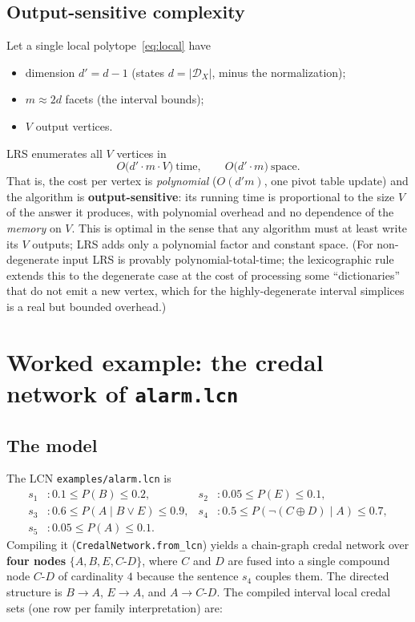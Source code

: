 \documentclass[11pt]{article}
\begin{document}
\subsection{Output-sensitive complexity}

Let a single local polytope~\eqref{eq:local} have
\begin{itemize}
  \item dimension $d' = d-1$ (states $d = |\mathcal{D}_X|$, minus the normalization);
  \item $m \approx 2d$ facets (the interval bounds);
  \item $V$ output vertices.
\end{itemize}
LRS enumerates all $V$ vertices in
\begin{equation}
  O\bigl(d' \cdot m \cdot V\bigr) \ \text{time}, \qquad O\bigl(d' \cdot m\bigr)\ \text{space}.
  \label{eq:lrs-cost}
\end{equation}
That is, the cost per vertex is \emph{polynomial} ($O(d' m)$, one pivot table update) and
the algorithm is \textbf{output-sensitive}: its running time is proportional to the size
$V$ of the answer it produces, with polynomial overhead and no dependence of the
\emph{memory} on $V$. This is optimal in the sense that any algorithm must at least write
its $V$ outputs; LRS adds only a polynomial factor and constant space. (For non-degenerate
input LRS is provably polynomial-total-time; the lexicographic rule extends this to the
degenerate case at the cost of processing some ``dictionaries'' that do not emit a new
vertex, which for the highly-degenerate interval simplices is a real but bounded overhead.)

\section{Worked example: the credal network of \texttt{alarm.lcn}}

\subsection{The model}

The LCN \texttt{examples/alarm.lcn} is
\begin{align*}
  s_1&: 0.1 \le P(B) \le 0.2, & s_2&: 0.05 \le P(E) \le 0.1,\\
  s_3&: 0.6 \le P(A \mid B \vee E) \le 0.9, &
  s_4&: 0.5 \le P(\neg(C \oplus D) \mid A) \le 0.7,\\
  s_5&: 0.05 \le P(A) \le 0.1.
\end{align*}
Compiling it (\texttt{CredalNetwork.from\_lcn}) yields a chain-graph credal network over
\textbf{four nodes} $\{A, B, E, C\text{-}D\}$, where $C$ and $D$ are fused into a single
compound node $C\text{-}D$ of cardinality $4$ because the sentence $s_4$ couples them.
The directed structure is $B \to A$, $E \to A$, and $A \to C\text{-}D$. The compiled
interval local credal sets (one row per family interpretation) are:
\end{document}
